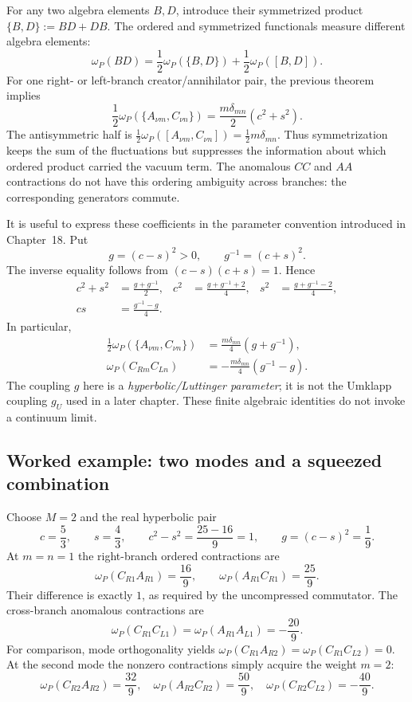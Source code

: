 For any two algebra elements $B,D$, introduce their symmetrized
product $\{B,D\}:=BD+DB$. The ordered and symmetrized functionals
measure different algebra elements:
\[
 \omega_P(BD)
 =\frac12\omega_P(\{B,D\})
  +\frac12\omega_P([B,D]).
\]
For one right- or left-branch creator/annihilator pair, the previous
theorem implies
\begin{equation}
 \frac12\omega_P(\{A_{\nu m},C_{\nu n}\})
   =\frac{m\delta_{mn}}2(c^2+s^2).
 \label{eq:ch19-mode-anticommutator}
\end{equation}
The antisymmetric half is
$\frac12\omega_P([A_{\nu m},C_{\nu n}])=
\frac12m\delta_{mn}$. Thus symmetrization keeps the sum of the
fluctuations but suppresses the information about which ordered
product carried the vacuum term. The anomalous $CC$ and $AA$
contractions do not have this ordering ambiguity across branches:
the corresponding generators commute.

It is useful to express these coefficients in the parameter convention
introduced in Chapter~18. Put
\begin{equation}
 g=(c-s)^2>0,\qquad g^{-1}=(c+s)^2.
 \label{eq:ch19-mode-g}
\end{equation}
The inverse equality follows from $(c-s)(c+s)=1$. Hence
\begin{align}
 c^2+s^2&=\frac{g+g^{-1}}2,
 & c^2&=\frac{g+g^{-1}+2}{4},
 & s^2&=\frac{g+g^{-1}-2}{4},\\
 cs&=\frac{g^{-1}-g}{4}.
 \label{eq:ch19-mode-g-coefficients}
\end{align}
In particular,
\begin{align*}
 \frac12\omega_P(\{A_{\nu m},C_{\nu n}\})
   &=\frac{m\delta_{mn}}4(g+g^{-1}),\\
 \omega_P(C_{Rm}C_{Ln})
   &=-\frac{m\delta_{mn}}4(g^{-1}-g).
\end{align*}
The coupling $g$ here is a \emph{hyperbolic/Luttinger parameter}; it
is not the Umklapp coupling $g_U$ used in a later chapter.
These finite algebraic identities do not invoke a continuum limit.

\subsection{Worked example: two modes and a squeezed combination}

Choose $M=2$ and the real hyperbolic pair
\[
 c=\frac53,\qquad s=\frac43,\qquad
 c^2-s^2=\frac{25-16}{9}=1,
 \qquad g=(c-s)^2=\frac19.
\]
At $m=n=1$ the right-branch ordered contractions are
\[
 \omega_P(C_{R1}A_{R1})=\frac{16}{9},\qquad
 \omega_P(A_{R1}C_{R1})=\frac{25}{9}.
\]
Their difference is exactly $1$, as required by the uncompressed
commutator. The cross-branch anomalous contractions are
\[
 \omega_P(C_{R1}C_{L1})
 =\omega_P(A_{R1}A_{L1})=-\frac{20}{9}.
\]
For comparison, mode orthogonality yields
$\omega_P(C_{R1}A_{R2})=\omega_P(C_{R1}C_{L2})=0$.
At the second mode the nonzero contractions simply acquire the
weight $m=2$:
\[
 \omega_P(C_{R2}A_{R2})=\frac{32}{9},\quad
 \omega_P(A_{R2}C_{R2})=\frac{50}{9},\quad
 \omega_P(C_{R2}C_{L2})=-\frac{40}{9}.
\]

